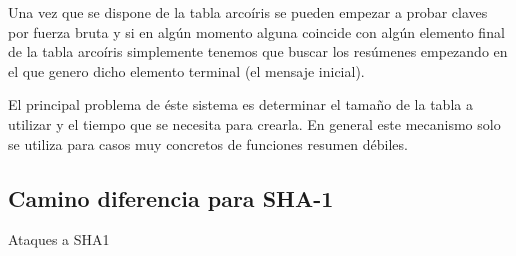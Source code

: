 Una vez que se dispone de la tabla arcoíris se pueden empezar a probar claves por fuerza bruta y si en algún momento alguna coincide con algún elemento final de la tabla arcoíris simplemente tenemos que buscar los resúmenes empezando en el que genero dicho elemento terminal (el mensaje inicial).

El principal problema de éste sistema es determinar el tamaño de la tabla a utilizar y el tiempo que se necesita para crearla. En general este mecanismo solo se utiliza para casos muy concretos de funciones resumen débiles.

\subsection{Camino diferencia para SHA-1\cite{citeulike:7684257}}
Ataques a SHA1


